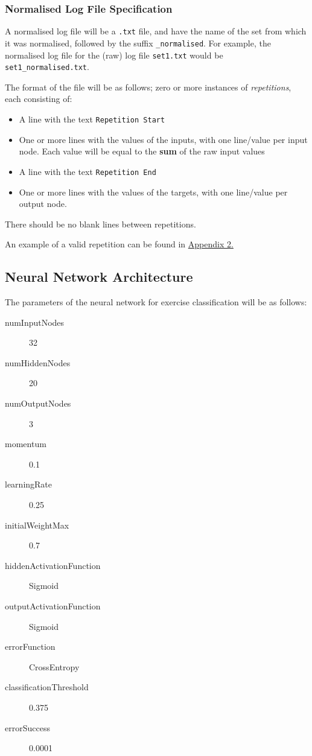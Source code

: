 \documentclass[a4paper]{article}
\begin{document}
\subsubsection{Normalised Log File Specification}

A normalised log file will be a \lstinline{.txt} file, and have the name of the set from which it was normalised, followed by the suffix \lstinline{_normalised}. For example, the normalised log file for the (raw) log file \lstinline{set1.txt} would be \lstinline{set1_normalised.txt}.

The format of the file will be as follows; zero or more instances of \emph{repetitions}, each consisting of:
\begin{itemize}
\item A line with the text \lstinline{Repetition Start}
\item One or more lines with the values of the inputs, with one line/value per input node. Each value will be equal to the \textbf{sum} of the raw input values
\item A line with the text \lstinline{Repetition End}
\item One or more lines with the values of the targets, with one line/value per output node.
\end{itemize}

There should be no blank lines between repetitions.

An example of a valid repetition can be found in \hyperref[subsubsec:a2_lf_normalised]{Appendix 2.}

\subsection{Neural Network Architecture}%
\label{subsec:dc_networkarchitecture}

The parameters of the neural network for exercise classification will be as follows:

\begin{description}
\item[numInputNodes] 32
\item[numHiddenNodes] 20
\item[numOutputNodes] 3
\item[momentum] 0.1
\item[learningRate] 0.25
\item[initialWeightMax] 0.7
\item[hiddenActivationFunction] Sigmoid
\item[outputActivationFunction] Sigmoid
\item[errorFunction] CrossEntropy
\item[classificationThreshold] 0.375
\item[errorSuccess] 0.0001
\end{description}
\end{document}
